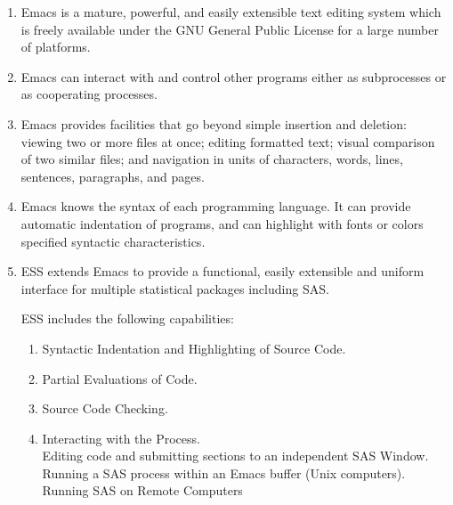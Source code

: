 \newpage
\begin{enumerate}
\item
Emacs is a mature, powerful, and easily extensible text editing system
which is freely available under the GNU General Public License for a
large number of platforms.
\item
Emacs can interact with and control other
programs either as subprocesses or as cooperating processes.
\item
Emacs
provides facilities that go beyond simple insertion and deletion:
viewing two or more files at once; editing formatted text; visual
comparison of two similar files; and navigation in units of
characters, words, lines, sentences, paragraphs, and pages.
\item
Emacs
knows the syntax of each programming language.  It can provide
automatic indentation of programs, and can highlight with fonts or
colors specified syntactic characteristics.
\item
ESS extends Emacs to provide a functional, easily extensible and
uniform interface for multiple statistical packages including SAS.

ESS includes the following capabilities:
\begin{enumerate}
\item Syntactic Indentation and Highlighting of Source Code.
\item Partial Evaluations of Code.
\item Source Code Checking.
\item Interacting with the Process.\\
 Editing code and submitting sections to an independent SAS Window.\\
 Running a SAS process within an Emacs buffer (Unix computers).\\
 Running SAS on Remote Computers
\end{enumerate}
\end{enumerate}




